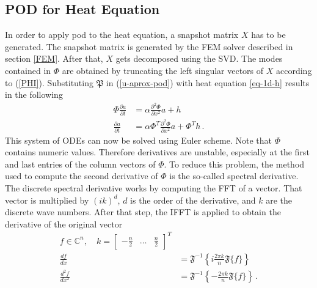 \subsection{POD for Heat Equation}
In order to apply pod to the heat equation, a snapshot matrix \(X\) has to be generated.
The snapshot matrix is generated by the FEM solver described in section \ref{FEM}.
After that, \(X\) gets decomposed using the SVD.
The modes contained in \(\Phi\) are obtained by truncating the left singular vectors of \(X\) according to (\ref{PHI}).
Substituting \(\mathfrak{P}\) in (\ref{u-aprox-pod}) with heat equation \ref{eq-1d-h} results in the following
\begin{align}
\Phi \frac{\partial a}{\partial t}  &= \alpha \frac{\partial^{2} \Phi}{\partial x^{2}} a + h\\
\frac{\partial a}{\partial t} &= \alpha \Phi^{T}  \frac{\partial^{2} \Phi}{\partial x^{2}} a + \Phi^{T}h \,.
\end{align}
This system of ODEs can now be solved using Euler scheme.
Note that \(\Phi\) contains numeric values.
Therefore derivatives are unstable, especially at the first and last entries of the column vectors of \(\Phi\).
To reduce this problem, the method used to compute the second derivative of \(\Phi\) is the so-called spectral derivative.
The discrete spectral derivative works by computing the FFT of a vector.
That vector is multiplied by \((ik)^{d}\), \(d\) is the order of the derivative, and \(k\) are the discrete wave numbers.
After that step, the IFFT is applied to obtain the derivative of the original vector \cite{brunton_kutz_2019f}
\begin{align}
f \in \mathbb{C}^{n}, \quad k = \begin{bmatrix}
-\frac{n}{2} & \hdots & \frac{n}{2}
\end{bmatrix}^{T} \\
\frac{df}{dx} &= \mathfrak{F}^{-1}\left\{i \frac{2 \pi k}{n} \mathfrak{F}\{f\}\right\} \\
\frac{d^{2}f}{dx^{2}} &= \mathfrak{F}^{-1}\left\{-\frac{2 \pi k}{n} \mathfrak{F}\{f\}\right\} \,.
\end{align}

